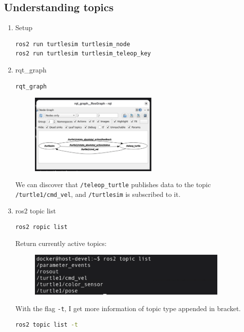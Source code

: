 \documentclass[12pt, a4paper]{article}
\begin{document}
\newpage
\subsection{Understanding topics}
\begin{enumerate}
	\item Setup
\begin{lstlisting}[language=bash]
ros2 run turtlesim turtlesim_node
ros2 run turtlesim turtlesim_teleop_key
\end{lstlisting}
	\item rqt\_graph
\begin{lstlisting}[language=bash]
rqt_graph
\end{lstlisting}
\begin{figure}[h]
	\centering
	\includegraphics[width=0.6\textwidth]{p1.4-1}
\end{figure}
We can discover that \texttt{/teleop\_turtle} publishes data to the topic \texttt{/turtle1/cmd\_vel}, and \texttt{/turtlesim} is subscribed to it.
\item ros2 topic list
\begin{lstlisting}[language=bash]
ros2 ropic list
\end{lstlisting}
Return currently active topics:
\begin{figure}[h]
	\setlength{\leftskip}{2.4em}
	\includegraphics[width=0.94\textwidth]{p1.4-2}
\end{figure}
With the flag \texttt{-t}, I get more information of topic type appended in bracket.
\begin{lstlisting}[language=bash]
ros2 topic list -t
\end{lstlisting}
\begin{figure}[h]
	\setlength{\leftskip}{2.4em}

\end{figure}
\end{enumerate}
\end{document}
